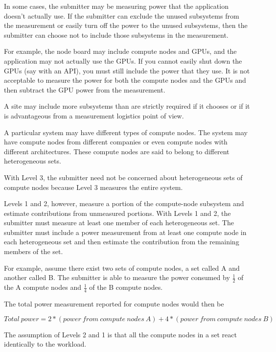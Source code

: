 \noindent
In some cases, the submitter may be measuring power that the application doesn't actually use. If the submitter can exclude the unused subsystems from the measurement or easily turn off the power to the unused subsystems, then the submitter can choose not to include those subsystems in the measurement. 
\wl

\noindent
For example, the node board may include compute nodes and GPUs, and the application may not actually use the GPUs.  If you cannot easily shut down the GPUs (say with an API), you must still include the power that they use. It is not acceptable to measure the power for both the compute nodes and the GPUs and then subtract the GPU power from the measurement.
\wl

\noindent
A site may include more subsystems than are strictly required if it chooses or if it is advantageous from a measurement logistics point of view.  
\wl

\noindent
A particular system may have different types of compute nodes. The system may have compute nodes from different companies or even compute nodes with different architectures. These compute nodes are said to belong to different heterogeneous sets.
\wl

\noindent
With Level 3, the submitter need not be concerned about heterogeneous sets of compute nodes because Level 3 measures the entire system. 
\wl

\noindent
Levels 1 and 2, however, measure a portion of the compute-node subsystem and estimate contributions from unmeasured portions. With Levels 1 and 2, the submitter must measure at least one member of each heterogeneous set. The submitter must include a power measurement from at least one compute node in each heterogeneous set and then estimate the contribution from the remaining members of the set. 
\wl

\noindent
For example, assume there exist two sets of compute nodes, a set called A and another called B.  The submitter is able to measure the power 
consumed by $ \frac{1}{2} $ of the A compute nodes and $ \frac{1}{4} $ of the B compute nodes.
\wl

\noindent
The total power measurement reported for compute nodes would then be 

\noindent
\[ Total~power=2*(power~from~compute~nodes~A) 
                              + 4*(power~from~compute~nodes~B) \]

\noindent
The assumption of Levels 2 and 1 is that all the compute nodes in a set react identically to the workload.


